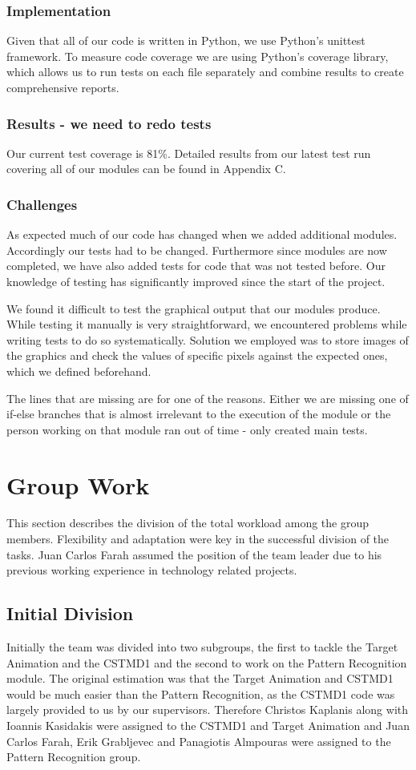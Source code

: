 \documentclass[a4paper,11pt]{article}
\begin{document}
\subsubsection{Implementation}
Given that all of our code is written in Python, we use Python's unittest framework. To measure code coverage we are using Python's coverage library, which allows us to run tests on each file separately and combine results to create comprehensive reports.

\subsubsection{Results - we need to redo tests}
Our current test coverage is 81\%. Detailed results from our latest test run covering all of our modules can be found in Appendix C.

\subsubsection{Challenges}
As expected much of our code has changed when we added additional modules. Accordingly our tests had to be changed. Furthermore since modules are now completed, we have also added tests for code that was not tested before. Our knowledge of testing has significantly improved since the start of the project.

We found it difficult to test the graphical output that our modules produce. While testing it manually is very straightforward, we encountered problems while writing tests to do so systematically. Solution we employed was to store images of the graphics and check the values of specific pixels against the expected ones, which we defined beforehand.

The lines that are missing are for one of the reasons. Either we are missing one of if-else branches that is almost irrelevant to the execution of the module or the person working on that module ran out of time - only created main tests. 
\clearpage
\section{Group Work}

This section describes the division of the total workload among the group members. Flexibility and adaptation were key in the successful division of the tasks. Juan Carlos Farah assumed the position of the team leader due to his previous working experience in technology related projects.

\subsection{Initial Division}
Initially the team was divided into two subgroups, the first to tackle the Target Animation and the CSTMD1 and the second to work on the Pattern Recognition module. The original estimation was that the Target Animation and CSTMD1 would be much easier than the Pattern Recognition, as the CSTMD1 code was largely provided to us by our supervisors. Therefore Christos Kaplanis along with Ioannis Kasidakis were assigned to the CSTMD1 and Target Animation and Juan Carlos Farah, Erik Grabljevec and Panagiotis Almpouras were assigned to the Pattern Recognition group.
\end{document}
